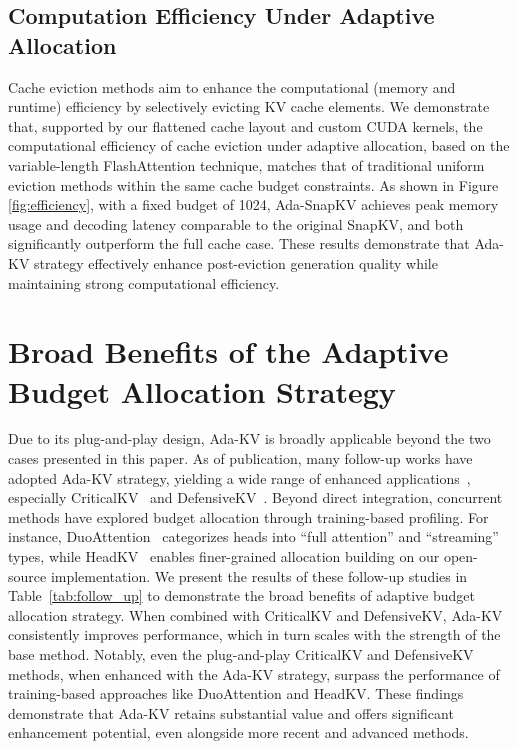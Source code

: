 \subsection{Computation Efficiency Under Adaptive Allocation}
\label{sc:exp_efficiency}
Cache eviction methods aim to enhance the computational (memory and runtime) efficiency by selectively evicting KV cache elements.
We demonstrate that, supported by our flattened cache layout and custom CUDA kernels, the computational efficiency of cache eviction under adaptive allocation, based on the variable-length FlashAttention technique, matches that of traditional uniform eviction methods within the same cache budget constraints.
As shown in Figure \ref{fig:efficiency}, with a fixed budget of 1024, Ada-SnapKV achieves peak memory usage and decoding latency comparable to the original SnapKV, and both  significantly outperform the full cache case.
These results demonstrate that Ada-KV strategy effectively enhance post-eviction generation quality while maintaining strong computational efficiency.



\section{Broad Benefits of the Adaptive Budget Allocation Strategy}
\label{sc:broad}
Due to its plug-and-play design, Ada-KV is broadly applicable beyond the two cases presented in this paper. As of publication, many follow-up works have adopted Ada-KV strategy, yielding a wide range of enhanced applications~\cite{kim2025kvzip, devoto2025expected,galim2025draft}, especially CriticalKV~\cite{feng2025identify} and DefensiveKV~\cite{feng2025tamingfragilitykvcache}.
Beyond direct integration, concurrent methods have explored budget allocation through training-based profiling. For instance, DuoAttention~\cite{xiao2024duoattention} categorizes heads into “full attention” and “streaming” types, while HeadKV~\cite{fu2024not} enables finer-grained allocation building on our open-source implementation. We present the results of these follow-up studies in Table~\ref{tab:follow_up} to demonstrate the broad benefits of adaptive budget allocation strategy. When combined with CriticalKV and DefensiveKV, Ada-KV consistently improves performance, which in turn scales with the strength of the base method. Notably, even the plug-and-play CriticalKV and DefensiveKV methods, when enhanced with the Ada-KV strategy, surpass the performance of training-based approaches like DuoAttention and HeadKV. These findings demonstrate that Ada-KV retains substantial value and offers significant enhancement potential, even alongside more recent and advanced methods.


